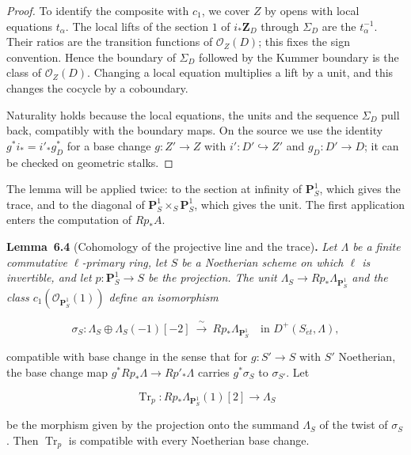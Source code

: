 \documentclass[11pt]{article}
\newenvironment{bpstatement}[2]{\par\addvspace{0.6\baselineskip}\noindent\textbf{#1}#2\textbf{.}\enspace\ignorespaces}
  {\par\addvspace{0.4\baselineskip}}
\newenvironment{bpstatementit}[2]{\begin{bpstatement}{#1}{#2}\itshape\ignorespaces}{\end{bpstatement}}
\begin{document}
\begin{proof}[{Proof}]
To identify the composite with \(c_1\), we cover \(Z\) by opens with local equations \(t_\alpha\). The local lifts of the section \(1\) of \(i_*\mathbf Z_D\) through \(\Sigma_D\) are the \(t_\alpha^{-1}\). Their ratios are the transition functions of \(\mathcal O_Z(D)\); this fixes the sign convention. Hence the boundary of \(\Sigma_D\) followed by the Kummer boundary is the class of \(\mathcal O_Z(D)\). Changing a local equation multiplies a lift by a unit, and this changes the cocycle by a coboundary.

Naturality holds because the local equations, the units and the sequence \(\Sigma_D\) pull back, compatibly with the boundary maps. On the source we use the identity \(g^*i_*=i'_*g_D^*\) for a base change \(g:Z'\to Z\) with \(i':D'\hookrightarrow Z'\) and \(g_D:D'\to D\); it can be checked on geometric stalks.
\end{proof}

\label{bp525}%
The lemma will be applied twice: to the section at infinity of \(\mathbf P^1_S\), which gives the trace, and to the diagonal of \(\mathbf P^1_S\times_S\mathbf P^1_S\), which gives the unit. The first application enters the computation of \(Rp_*A\).

\label{bp526}%
\begin{bpstatementit}{Lemma~6.4}{ (Cohomology of the projective line and the trace)}
Let \(\Lambda\) be a finite commutative \(\ell\)-primary ring, let \(S\) be a Noetherian scheme on which \(\ell\) is invertible, and let \(p:\mathbf P^1_S\to S\) be the projection. The unit \(\Lambda_S\to Rp_*\Lambda_{\mathbf P^1_S}\) and the class \(c_1(\mathcal O_{\mathbf P^1_S}(1))\) define an isomorphism

\[
\sigma_S:\Lambda_S\oplus\Lambda_S(-1)[-2]
\ \xrightarrow{\ \sim\ }\ Rp_*\Lambda_{\mathbf P^1_S}
\quad\text{in }D^+(S_{\acute{e}t},\Lambda),
\tag{6.4}
\]

compatible with base change in the sense that for \(g:S'\to S\) with \(S'\) Noetherian, the base change map \(g^*Rp_*\Lambda\to Rp'_*\Lambda\) carries \(g^*\sigma_S\) to \(\sigma_{S'}\). Let

\[
\operatorname{Tr}_p:Rp_*\Lambda_{\mathbf P^1_S}(1)[2]\longrightarrow\Lambda_S
\tag{6.5}
\]

be the morphism given by the projection onto the summand \(\Lambda_S\) of the twist of \(\sigma_S\). Then \(\operatorname{Tr}_p\) is compatible with every Noetherian base change.
\end{bpstatementit}
\end{document}

